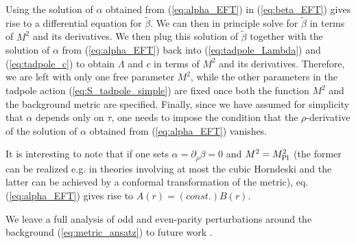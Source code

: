 \documentclass[a4paper,11pt]{article}
\numberwithin{equation}{section}
\begin{document}
Using the solution of $\alpha$ obtained from (\ref{eq:alpha_EFT}) in (\ref{eq:beta_EFT}) gives rise to a differential equation for $\tilde{\beta}$. We can then in principle solve for $\tilde{\beta}$ in terms of $M^2$ and its derivatives. We then plug this solution of $\tilde{\beta}$ together with the solution of $\alpha$ from (\ref{eq:alpha_EFT})  back into (\ref{eq:tadpole_Lambda}) and (\ref{eq:tadpole_c}) to obtain $\Lambda$ and $c$ in terms of $M^2$ and its derivatives. Therefore, we are left with only one free parameter $M^2$, while the other parameters in the tadpole action (\ref{eq:S_tadpole_simple}) are fixed once both the function $M^2$ and the background metric are specified. Finally, since we have assumed for simplicity that $\alpha$ depends only on $\tau$, one needs to impose the condition that the $\rho$-derivative of the solution of $\alpha$ obtained from (\ref{eq:alpha_EFT}) vanishes. 


It is interesting to note that if one sets $\alpha = \partial_\rho \beta = 0$ and $M^2 = M_{\rm Pl}^2$ (the former can be realized e.g. in theories involving at most the cubic Horndeski and the latter can be achieved by a conformal transformation of the metric), eq.(\ref{eq:alpha_EFT}) gives rise to $A(r) = (const.) B(r)$. 

We leave a full analysis of odd and even-parity perturbations around the background (\ref{eq:metric_ansatz}) to future work \cite{Mukohyama:2022skv}. 
\end{document}
